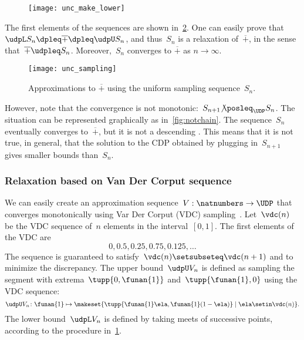\begin{figure}[h]
    \texttt{[image: unc\_make\_lower]}
    \caption{}
    \label{fig:make_lower}
\end{figure}

The first elements of the sequences are shown in~\cref{fig:approx_invplus}.
One can easily prove that~$\udpL S_{n}\dpleq\overline{+}\dpleq\udpU S_{n}$, and thus~$S_{n}$ is a relaxation of~$\overline{+}$, in the sense that~$\overline{+}\udpleq S_{n}$.
Moreover,~$S_{n}$ converges to $\overline{+}$ as $n\rightarrow\infty$.

\begin{figure}[h]
    \centering
    \texttt{[image: unc\_sampling]}
    \caption{Approximations to $\overline{+}$ using the uniform sampling sequence~$S_{n}$. }
    \label{fig:approx_invplus}
\end{figure}

However, note that the convergence is not monotonic:~$S_{n+1}{\not\posleq}_{\UDP}S_{n}$.
The situation can be represented graphically as in~\cref{fig:notchain}.
The sequence~$S_{n}$ eventually converges to~$\overline{+}$, but it is not a descending .
This means that it is not true, in general, that the solution to the CDP obtained by plugging in~$S_{n+1}$ gives smaller bounds than~$S_{n}$.

\subsubsection*{Relaxation based on Van Der Corput sequence}
\label{sec:van-der-corput}
We can easily create an approximation sequence~$V:\natnumbers\to\UDP$ that converges monotonically using Var Der Corput (VDC) sampling~\cite[Section 5.2]{LaValle2006Planning}.
Let~$\vdc(n)$ be the VDC sequence of~$n$ elements in the interval~$[0,1]$.
The first elements of the VDC are
\begin{equation}
    0,0.5,0.25,0.75,0.125,\dots
\end{equation}
The sequence is guaranteed to satisfy~$\vdc(n)\setsubseteq\vdc(n+1)$ and to minimize the discrepancy.
The upper bound~$\udpU V_{n}$ is defined as sampling the segment with extrema~$\tupp{ 0,\funan{1}} $ and~$\tupp{\funan{1},0}$ using the VDC sequence:
\begin{equation}
    \udpU V_{n}\colon\funan{1}\mapsto\makeset{ \tupp{\funan{1}\ela,\funan{1}(1-\ela)} \mid \ela\setin\vdc(n)}.
\end{equation}
The lower bound~$\udpL V_{n}$ is defined by taking meets of successive points, according to the procedure in~\cref{fig:make_lower}.

